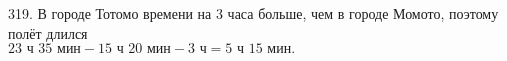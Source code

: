319. В городе Тотомо времени на 3 часа больше, чем в городе Момото, поэтому полёт длился\\ $23\text{ ч }35\text{ мин}-15\text{ ч }20\text{ мин}-3\text{ ч}=5\text{ ч }15\text{ мин}.$\\
